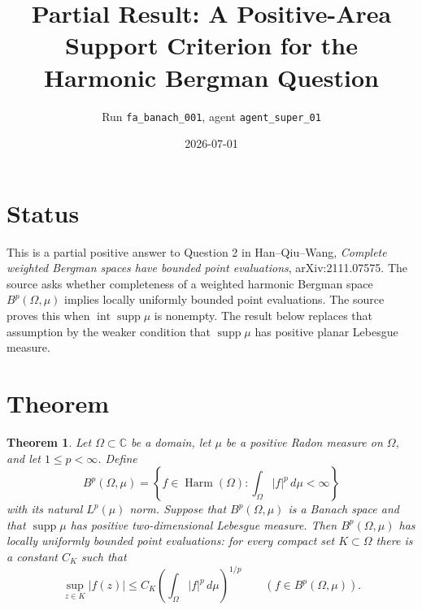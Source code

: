 \documentclass[11pt]{article}
\title{Partial Result: A Positive-Area Support Criterion for the Harmonic Bergman Question}
\author{Run \texttt{fa\_banach\_001}, agent \texttt{agent\_super\_01}}
\date{2026-07-01}
\newtheorem{theorem}{Theorem}
\newcommand{\C}{\mathbb C}
\newcommand{\supp}{\operatorname{supp}}
\newcommand{\Harm}{\operatorname{Harm}}
\begin{document}
\maketitle

\section*{Status}

This is a partial positive answer to Question 2 in Han--Qiu--Wang,
\emph{Complete weighted Bergman spaces have bounded point evaluations},
arXiv:2111.07575. The source asks whether completeness of a weighted harmonic
Bergman space $B^p(\Omega,\mu)$ implies locally uniformly bounded point
evaluations. The source proves this when $\operatorname{int}\operatorname{supp}\mu$
is nonempty. The result below replaces that assumption by the weaker condition
that $\operatorname{supp}\mu$ has positive planar Lebesgue measure.

\section*{Theorem}

\begin{theorem}
Let $\Omega\subset\C$ be a domain, let $\mu$ be a positive Radon measure on
$\Omega$, and let $1\leq p<\infty$. Define
\[
  B^p(\Omega,\mu)
  =
  \left\{f\in \Harm(\Omega):
    \int_\Omega |f|^p\,d\mu<\infty
  \right\}
\]
with its natural $L^p(\mu)$ norm. Suppose that $B^p(\Omega,\mu)$ is a Banach
space and that $\supp\mu$ has positive two-dimensional Lebesgue measure. Then
$B^p(\Omega,\mu)$ has locally uniformly bounded point evaluations: for every
compact set $K\subset\Omega$ there is a constant $C_K$ such that
\[
  \sup_{z\in K}|f(z)|
  \leq C_K\left(\int_\Omega |f|^p\,d\mu\right)^{1/p}
  \qquad (f\in B^p(\Omega,\mu)).
\]
\end{theorem}
\end{document}
